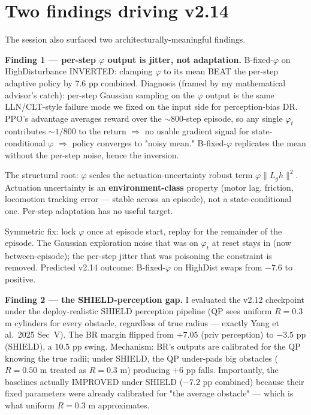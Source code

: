 \documentclass[11pt]{article}
\begin{document}
\section{Two findings driving v2.14}

The session also surfaced two architecturally-meaningful findings.

\noindent
\textbf{Finding 1 --- per-step $\varphi$ output is jitter, not adaptation.}
B-fixed-$\varphi$ on HighDisturbance INVERTED: clamping $\varphi$ to its
mean BEAT the per-step adaptive policy by $7.6$ pp combined. Diagnosis
(framed by my mathematical advisor's catch): per-step Gaussian sampling
on the $\varphi$ output is the same LLN/CLT-style failure mode we fixed
on the input side for perception-bias DR. PPO's advantage averages
reward over the $\sim 800$-step episode, so any single $\varphi_t$
contributes $\sim 1/800$ to the return $\Rightarrow$ no usable
gradient signal for state-conditional $\varphi$ $\Rightarrow$ policy
converges to "noisy mean." B-fixed-$\varphi$ replicates the mean
without the per-step noise, hence the inversion.

The structural root: $\varphi$ scales the actuation-uncertainty robust
term $\varphi \lVert L_g h \rVert^2$. Actuation uncertainty is an
\textbf{environment-class} property (motor lag, friction, locomotion
tracking error --- stable across an episode), not a state-conditional
one. Per-step adaptation has no useful target.

Symmetric fix: lock $\varphi$ once at episode start, replay for the
remainder of the episode. The Gaussian exploration noise that was on
$\varphi_t$ at reset stays in (now between-episode); the per-step
jitter that was poisoning the constraint is removed. Predicted v2.14
outcome: B-fixed-$\varphi$ on HighDist swaps from $-7.6$ to positive.

\noindent
\textbf{Finding 2 --- the SHIELD-perception gap.} I evaluated the v2.12
checkpoint under the deploy-realistic SHIELD perception pipeline (QP
sees uniform $R = 0.3$ m cylinders for every obstacle, regardless of
true radius --- exactly Yang et al.\ 2025 Sec~V). The BR margin
flipped from $+7.05$ (priv perception) to $-3.5$ pp (SHIELD), a
$10.5$ pp swing. Mechanism: BR's outputs are calibrated for the QP
knowing the true radii; under SHIELD, the QP under-pads big obstacles
($R = 0.50$ m treated as $R = 0.3$ m) producing $+6$ pp falls.
Importantly, the baselines actually IMPROVED under SHIELD ($-7.2$ pp
combined) because their fixed parameters were already calibrated for
"the average obstacle" --- which is what uniform $R = 0.3$ m
approximates.
\end{document}
